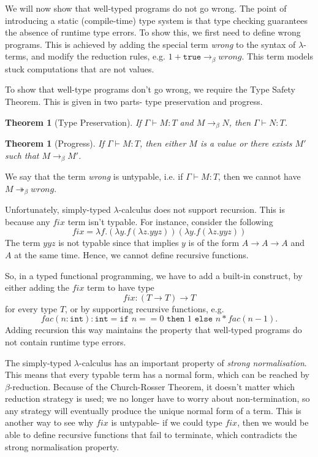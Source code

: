 \documentclass[a4paper, openany]{memoir}
\newtheorem{theorem}[proposition]{Theorem}
\theoremstyle{definition}
\begin{document}
    We will now show that well-typed programs do not go wrong. The point of introducing a static (compile-time) type system is that type checking guarantees the absence of runtime type errors. To show this, we first need to define wrong programs. This is achieved by adding the special term \textit{wrong} to the syntax of $\lambda$-terms, and modify the reduction rules, e.g. $1 + \texttt{true} \to_\beta \textit{wrong}$. This term models stuck computations that are not values.

    To show that well-type programs don't go wrong, we require the Type Safety Theorem. This is given in two parts- type preservation and progress.
    \begin{theorem}[Type Preservation]
        If $\Gamma \vdash M \colon T$ and $M \to_\beta N$, then $\Gamma \vdash N \colon T$.
    \end{theorem}
    \begin{theorem}[Progress]
        If $\Gamma \vdash M \colon T$, then either $M$ is a value or there exists $M'$ such that $M \to_\beta M'$.
    \end{theorem}
    \noindent We say that the term \textit{wrong} is untypable, i.e. if $\Gamma \vdash M \colon T$, then we cannot have $M \twoheadrightarrow_\beta \textit{wrong}$.

    Unfortunately, simply-typed $\lambda$-calculus does not support recursion. This is because any $fix$ term isn't typable. For instance, consider the following
    \[fix = \lambda f.(\lambda y.f(\lambda z.yyz))(\lambda y.f(\lambda z.yyz))\]
    The term $yyz$ is not typable since that implies $y$ is of the form $A \to A \to A$ and $A$ at the same time. Hence, we cannot define recursive functions.

    So, in a typed functional programming, we have to add a built-in construct, by either adding the $fix$ term to have type
    \[fix \colon (T \to T) \to T\]
    for every type $T$, or by supporting recursive functions, e.g.
    \[fac(n \colon \texttt{int}) \colon \texttt{int} = \texttt{if } n == 0 \texttt{ then } 1 \texttt{ else } n * fac(n-1).\]
    Adding recursion this way maintains the property that well-typed programs do not contain runtime type errors.

    The simply-typed $\lambda$-calculus has an important property of \emph{strong normalisation}. This means that every typable term has a normal form, which can be reached by $\beta$-reduction. Because of the Church-Rosser Theorem, it doesn't matter which reduction strategy is used; we no longer have to worry about non-termination, so any strategy will eventually produce the unique normal form of a term. This is another way to see why $fix$ is untypable- if we could type $fix$, then we would be able to define recursive functions that fail to terminate, which contradicts the strong normalisation property.
\end{document}

